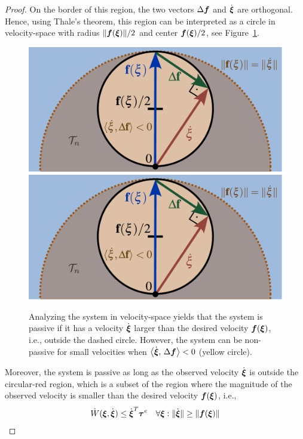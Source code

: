 \begin{proof}
On the border of this region, the two vectors $\Delta \boldsymbol{f}$ and $\dot{{\boldsymbol{\xi}}}$ are orthogonal.
Hence, using Thale's theorem, this region can be interpreted as a circle in velocity-space with radius $\| \boldsymbol{f} ({\boldsymbol{\xi}}) \| / 2$ and center $\boldsymbol{f}({\boldsymbol{\xi}}) / 2$, see Figure~\ref{fig:passivity_analysis}.

\begin{figure}[thb]
	\centering
	\ifthesis
    \includegraphics[width=0.7\columnwidth]{figures/passivity_analysis}
	\else
    \includegraphics[width=.8\columnwidth]{figures/passivity_analysis}
	\fi
	\caption{Analyzing the system in velocity-space yields that the system is passive if it has a velocity $\dot{\boldsymbol{\xi}}$ larger than the desired velocity $\boldsymbol{f}(\boldsymbol{\xi})$, i.e., outside the dashed circle.
    However, the system can be non-passive for small velocities when  $\left\langle {\dot{\boldsymbol{\xi}}}, \, {\Delta \boldsymbol{f}} \right\rangle < 0$ (yellow circle).}
	\label{fig:passivity_analysis}
\end{figure}

Moreover, the system is passive as long as the observed velocity $\dot{{\boldsymbol{\xi}}}$ is outside the circular-red region, which is a subset of the region where the magnitude of the observed velocity is smaller than the desired velocity $\boldsymbol{f}({\boldsymbol{\xi}})$, i.e.,
\begin{equation}
	\dot W({\boldsymbol{\xi}}, \dot{{\boldsymbol{\xi}}}) \leq \dot{{\boldsymbol{\xi}}}^T \boldsymbol{\tau}^e
 \quad \forall {\boldsymbol{\xi}} : \| \dot{{\boldsymbol{\xi}}} \| \geq\| \boldsymbol{f}({\boldsymbol{\xi}}) \| 
\end{equation}

\end{proof}

